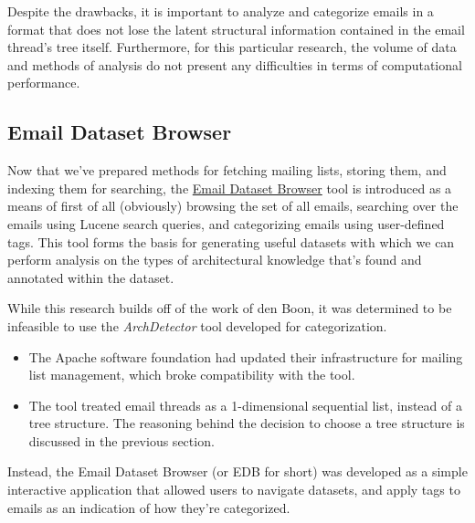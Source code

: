 \documentclass[a4paper, 12pt]{article}
\begin{document}
		Despite the drawbacks, it is important to analyze and categorize emails in a format that does not lose the latent structural information contained in the email thread's tree itself. Furthermore, for this particular research, the volume of data and methods of analysis do not present any difficulties in terms of computational performance.
	
	\subsection{Email Dataset Browser}
		Now that we've prepared methods for fetching mailing lists, storing them, and indexing them for searching, the \href{https://github.com/ArchitecturalKnowledgeAnalysis/EmailDatasetBrowser}{Email Dataset Browser} tool is introduced as a means of first of all (obviously) browsing the set of all emails, searching over the emails using Lucene search queries, and categorizing emails using user-defined tags. This tool forms the basis for generating useful datasets with which we can perform analysis on the types of architectural knowledge that's found and annotated within the dataset.
		
		While this research builds off of the work of den Boon\autocite{denboon}, it was determined to be infeasible to use the \textit{ArchDetector} tool developed for categorization.
		
		\begin{itemize}
			\item The Apache software foundation had updated their infrastructure for mailing list management, which broke compatibility with the tool.
			\item The tool treated email threads as a 1-dimensional sequential list, instead of a tree structure. The reasoning behind the decision to choose a tree structure is discussed in the previous section.
		\end{itemize}
	
		Instead, the Email Dataset Browser (or EDB for short) was developed as a simple interactive application that allowed users to navigate datasets, and apply tags to emails as an indication of how they're categorized.
		
\end{document}
